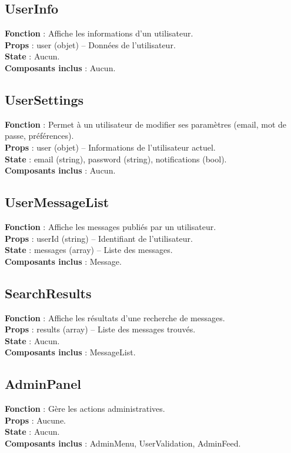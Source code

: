 \documentclass{article}
\begin{document}
\subsection*{UserInfo}
\textbf{Fonction} : Affiche les informations d’un utilisateur.\\
\textbf{Props} : user (objet) – Données de l’utilisateur.\\
\textbf{State} : Aucun.\\
\textbf{Composants inclus} : Aucun.

\subsection*{UserSettings}
\textbf{Fonction} : Permet à un utilisateur de modifier ses paramètres (email, mot de passe, préférences).\\
\textbf{Props} : user (objet) – Informations de l’utilisateur actuel.\\
\textbf{State} : email (string), password (string), notifications (bool).\\
\textbf{Composants inclus} : Aucun.

\subsection*{UserMessageList}
\textbf{Fonction} : Affiche les messages publiés par un utilisateur.\\
\textbf{Props} : userId (string) – Identifiant de l’utilisateur.\\
\textbf{State} : messages (array) – Liste des messages.\\
\textbf{Composants inclus} : Message.

\subsection*{SearchResults}
\textbf{Fonction} : Affiche les résultats d’une recherche de messages.\\
\textbf{Props} : results (array) – Liste des messages trouvés.\\
\textbf{State} : Aucun.\\
\textbf{Composants inclus} : MessageList.

\subsection*{AdminPanel}
\textbf{Fonction} : Gère les actions administratives.\\
\textbf{Props} : Aucune.\\
\textbf{State} : Aucun.\\
\textbf{Composants inclus} : AdminMenu, UserValidation, AdminFeed.
\end{document}
